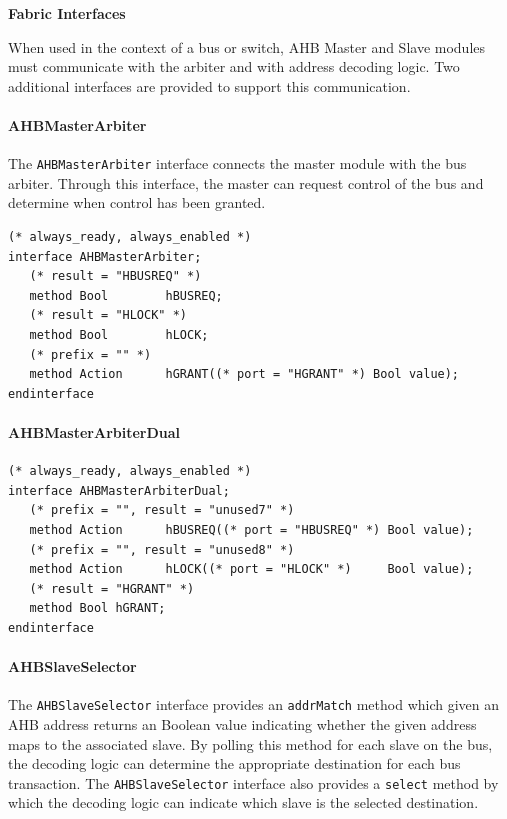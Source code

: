 \documentclass[twoside,letterpaper]{article}
\newcommand{\te}[1]{\texttt{#1}}
\begin{document}
{\bf Fabric Interfaces}

When used in the context of a bus or switch, AHB Master and Slave
modules must communicate with the arbiter and with address decoding
logic. Two additional interfaces are provided to support this
communication.

\paragraph{\bf AHBMasterArbiter} The \te{AHBMasterArbiter} interface 
connects the master module with the bus arbiter.  Through this
interface, the master can request control of the bus and determine
when control has been granted.

\begin{verbatim}
(* always_ready, always_enabled *)
interface AHBMasterArbiter;
   (* result = "HBUSREQ" *)
   method Bool        hBUSREQ;
   (* result = "HLOCK" *)
   method Bool        hLOCK;
   (* prefix = "" *)
   method Action      hGRANT((* port = "HGRANT" *) Bool value);
endinterface
\end{verbatim}


\paragraph{\bf AHBMasterArbiterDual}

\begin{verbatim}
(* always_ready, always_enabled *)
interface AHBMasterArbiterDual;
   (* prefix = "", result = "unused7" *)
   method Action      hBUSREQ((* port = "HBUSREQ" *) Bool value);
   (* prefix = "", result = "unused8" *)
   method Action      hLOCK((* port = "HLOCK" *)     Bool value);
   (* result = "HGRANT" *)
   method Bool hGRANT;
endinterface
\end{verbatim}

\paragraph{\bf AHBSlaveSelector} The \te{AHBSlaveSelector} interface 
provides an \te{addrMatch} method which given an AHB address returns
an Boolean value indicating whether the given address maps to the
associated slave. By polling this method for each slave on the bus,
the decoding logic can determine the appropriate destination for each
bus transaction. The \te{AHBSlaveSelector} interface also provides a
\te{select} method by which the decoding logic can indicate which 
slave is the selected destination.
\end{document}
